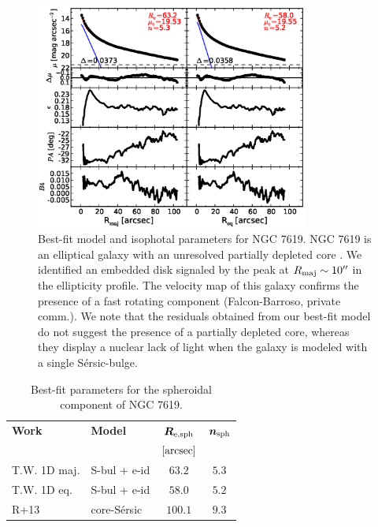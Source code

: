 \documentclass[preprint2]{emulateapj}
\newcommand{\fitfigurewidth}{0.8\textwidth}
\begin{document}
  \begin{figure}[h]
  \begin{center}
  \includegraphics[width=\fitfigurewidth]{images/n7619_1Dfit.eps}
  \caption{Best-fit model and isophotal parameters for NGC 7619.
  NGC 7619 is an elliptical galaxy with an unresolved partially depleted core \citep{rusli2013}. %
  We identified an embedded disk signaled by the peak at $R_{\rm maj} \sim 10''$ in the ellipticity profile.
  The velocity map of this galaxy confirms the presence of a fast rotating component (Falcon-Barroso, private comm.).
  We note that the residuals obtained from our best-fit model do not suggest the presence of a partially depleted core,
  whereas they display a nuclear lack of light when the galaxy is modeled with a single S\'ersic-bulge. 
  }
  \end{center}
  \end{figure}

  \begin{table}[h]
  \small
  \caption{Best-fit parameters for the spheroidal component of NGC 7619.}
  \begin{center}
  \begin{tabular}{llcc}
  \hline
  {\bf Work} & {\bf Model}   & $\bm R_{\rm e,sph}$    & $\bm n_{\rm sph}$ \\
    &  &  $[\rm arcsec]$ & \\
  \hline
  T.W. 1D maj. & S-bul + e-id & $63.2$  &  $5.3$ \\
  T.W. 1D eq.  & S-bul + e-id & $58.0$  &  $5.2$ \\
  \hline
  R+13      & core-S\'ersic & $100.1$  &  $9.3$ \\
  \hline
  \end{tabular}
  \end{center}
  \label{tab:n7619}
  \end{table}
\end{document}
